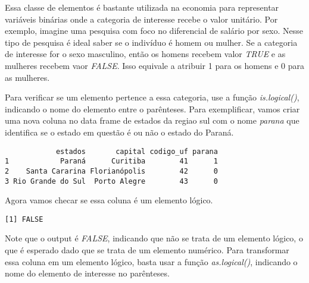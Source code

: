\documentclass[
  letterpaper,
  DIV=11,
  numbers=noendperiod]{scrreprt}
\newenvironment{Shaded}{\begin{snugshade}}{\end{snugshade}}
\newcommand{\DecValTok}[1]{\textcolor[rgb]{0.68,0.00,0.00}{#1}}
\newcommand{\FunctionTok}[1]{\textcolor[rgb]{0.28,0.35,0.67}{#1}}
\newcommand{\NormalTok}[1]{\textcolor[rgb]{0.00,0.23,0.31}{#1}}
\newcommand{\OtherTok}[1]{\textcolor[rgb]{0.00,0.23,0.31}{#1}}
\newcommand{\SpecialCharTok}[1]{\textcolor[rgb]{0.37,0.37,0.37}{#1}}
\begin{document}
Essa classe de elementos é bastante utilizada na economia para
representar variáveis binárias onde a categoria de interesse recebe o
valor unitário. Por exemplo, imagine uma pesquisa com foco no
diferencial de salário por sexo. Nesse tipo de pesquisa é ideal saber se
o indivíduo é homem ou mulher. Se a categoria de interesse for o sexo
masculino, então os homens recebem valor \emph{TRUE} e as mulheres
recebem vaor \emph{FALSE}. Isso equivale a atribuir 1 para os homens e 0
para as mulheres.

Para verificar se um elemento pertence a essa categoria, use a função
\emph{is.logical()}, indicando o nome do elemento entre o parênteses.
Para exemplificar, vamos criar uma nova coluna no data frame de estados
da regiao sul com o nome \emph{parana} que identifica se o estado em
questão é ou não o estado do Paraná.

\begin{Shaded}
\end{Shaded}

\begin{verbatim}
            estados       capital codigo_uf parana
1            Paraná      Curitiba        41      1
2    Santa Cararina Florianópolis        42      0
3 Rio Grande do Sul  Porto Alegre        43      0
\end{verbatim}

Agora vamos checar se essa coluna é um elemento lógico.

\begin{Shaded}
\end{Shaded}

\begin{verbatim}
[1] FALSE
\end{verbatim}

Note que o output é \emph{FALSE}, indicando que não se trata de um
elemento lógico, o que é esperado dado que se trata de um elemento
numérico. Para transformar essa coluna em um elemento lógico, basta usar
a função \emph{as.logical()}, indicando o nome do elemento de interesse
no parênteses.
\end{document}
